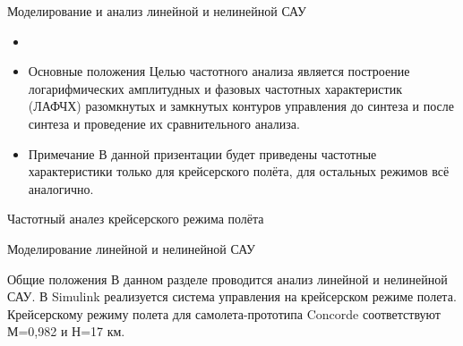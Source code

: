 \begin{frame}{Моделирование и анализ линейной и нелинейной САУ}
    \begin{itemize}
        \item <+-> []
        \item <+-> []
    \begin{block}{Основные положения}
        Целью частотного анализа является построение логарифмических амплитудных и фазовых частотных характеристик (ЛАФЧХ) 
        разомкнутых и замкнутых контуров управления до синтеза и после синтеза и проведение их сравнительного анализа.
    \end{block}
    \item <+-> []
    \begin{block}{Примечание}
        В данной призентации будет приведены частотные характеристики только для крейсерского полёта, 
        для остальных режимов всё аналогично.
    \end{block}
\end{itemize}
\end{frame}

\begin{frame}{Частотный аналез крейсерского режима полёта}
\end{frame}

\begin{frame}{Моделирование линейной и нелинейной САУ}
    \begin{block}{Общие положения}
        В данном разделе проводится анализ линейной и нелинейной САУ. В Simulink реализуется система управления на 
        крейсерском режиме полета. Крейсерскому режиму полета для самолета-прототипа Concorde соответствуют 
        М=0,982 и Н=17 км. 
    \end{block}
\end{frame}

